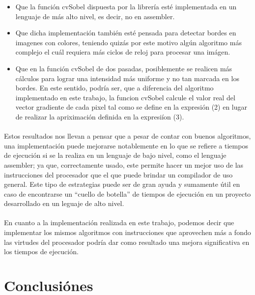 \documentclass[11pt, a4paper]{article}
\begin{document}
\begin{itemize}
\item Que la funci\'on cvSobel dispuesta por la librer\'ia est\'e implementada en un lenguaje de m\'as alto nivel, es decir, no en assembler.
\item Que dicha implementaci\'on tambi\'en est\'e pensada para detectar bordes en imagenes con colores, teniendo quiz\'as por este motivo alg\'un algoritmo m\'as complejo el cu\'al requiera m\'as ciclos de reloj para procesar una im\'agen.
\item Que en la funci\'on cvSobel de dos pasadas, posiblemente se realicen m\'as c\'alculos para lograr una intensidad m\'as uniforme y no tan marcada en los bordes. En este sentido, podr\'ia ser, que a diferencia del algoritmo implementado en este trabajo, la funcion cvSobel calcule el valor real del vector gradiente de cada pixel tal como se define en la expresi\'on (2) en lugar de realizar la apriximaci\'on definida en la expresi\'ion (3).

\end{itemize}

\paragraph{}
Estos resultados nos llevan a pensar que a pesar de contar con buenos algoritmos, una implementaci\'on puede mejorarse notablemente en lo que se refiere a tiempos de ejecuci\'on si se la realiza en un lenguaje de bajo nivel, como el lenguaje assembler; ya que, correctamente usado, este permite hacer un mejor uso de las instrucciones del procesador que el que puede brindar un compilador de uso general. Este tipo de estrategias puede ser de gran ayuda y sumamente \'util en caso de encontrarse un ``cuello de botella'' de tiempos de ejecuci\'on en un proyecto desarrollado en un leguaje de alto nivel.

\paragraph{}
En cuanto a la implementaci\'on realizada en este trabajo, podemos decir que implementar los mismos algoritmos con instrucciones que aprovechen m\'as a fondo las virtudes del procesador podr\'ia dar como resultado una mejora significativa en los tiempos de ejecuci\'on.


\newpage

\section{Conclusi\'ones}
\end{document}
